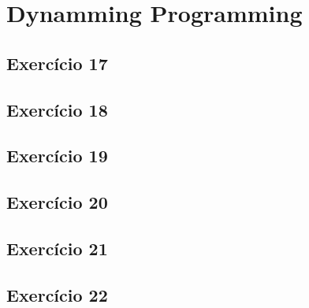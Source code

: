 \section{Dynamming Programming}\label{sec:dynamic_programming}

\subsection{Exercício 17}\label{sec:exer17}

\subsection{Exercício 18}\label{sec:exer18}

\subsection{Exercício 19}\label{sec:exer19}

\subsection{Exercício 20}\label{sec:exer20}

\subsection{Exercício 21}\label{sec:exer21}

\subsection{Exercício 22}\label{sec:exer22}
